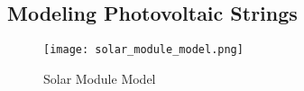 \subsection{Modeling Photovoltaic Strings}\label{subsec:solar_cell_strings}


\begin{figure}[!htbp]
    \texttt{[image: solar\_module\_model.png]}
    \caption{Solar Module Model}
    \label{fig:solar_module_model}
\end{figure}
